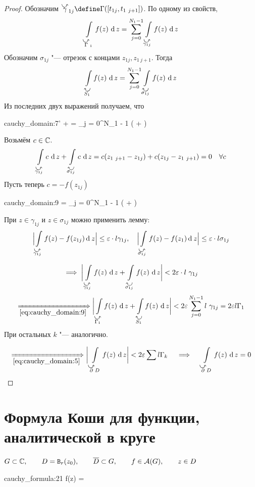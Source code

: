 \begin{proof}
	Обозначим $ \curvedir\gamma_{1j} \define \Gamma([t_{1j}, t_{1~j + 1}]) $. По одному из свойств,
	$$ \cint[z]{\curvedir\Gamma_1}{f(z)} = \sum_{j = 0}^{N_1 - 1} \cint[z]{\curvedir{\gamma_{1j}}}{f(z)} $$
	Обозначим $ \sigma_{1j} $ "--- отрезок с концами $ z_{1j}, z_{1~j + 1} $. Тогда
	$$ \cint[z]{\curvedir[0] {S_1}}{f(z)} = \sum_{j = 0}^{N_1 - 1} \cint[z]{\curvedir[0]{\sigma_{1j}}}{f(z)} $$
	Из последних двух выражений получаем, что
	\begin{equ}{cauchy_domain:7'}
		 +  = \sum_{j = 0}^{N_1 - 1} \bigg(  +  \bigg)
	\end{equ}
	Возьмём $ c \in \mathbb{C} $.
	$$ \cint[z]{\curvedir{\gamma_{1j}}}c + \cint[z]{\curvedir[0]{\sigma_{1j}}}c = c(z_{1~j + 1} - z_{1j}) + c(z_{1j} - z_{1~j + 1}) = 0 \quad \forall c $$
	Пусть теперь $ c = -f(z_{1j}) $
	\begin{equ}{cauchy_domain:9}
		 = \sum_{j = 0}^{N_1 - 1} \bigg(  +  \bigg)
	\end{equ}
	При $ z \in \gamma_{1j} $ и $ z \in \sigma_{1j} $ можно применить лемму:
	$$ \Bigl| \int\limits_{\curvedir{\gamma_{1j}}} f(z) - f(z_{1j}) \di z \Bigr| \le \eps \cdot l \gamma_{1j}, \quad \Bigl| \int\limits_{\curvedir{\sigma_{1j}}} f(z) - f(z_1) \di z \Bigr| \le \eps \cdot l \sigma_{1j} $$

	$$ \implies \bigg| \cint[z]{\curvedir{\gamma_{1j}}}{f(z)} + \cint[z]{\curvedir[0]{\sigma_{1j}}}{f(z)} \bigg| < 2\eps \cdot l ~ \gamma_{1j} $$
	$$ \underimp{\eref{cauchy_domain:9}} \bigg| \cint[z]{\curvedir{\Gamma_1}}{f(z)} + \cint[z]{\curvedir[0]{S_1}}{f(z)} \bigg| < 2\eps \sum_{j = 0}^{N_1 - 1} l ~ \gamma_{1j} = 2 \eps l \Gamma_1 $$
	При остальных $ k $ "--- аналогично.

	$$ \underimp{\eref{cauchy_domain:5}} \bigg| \cint[z]{\curvedir\partial D}{f(z)} \bigg| < 2\eps \sum l \Gamma_k \quad
	\implies \quad \cint[z]{\curvedir\partial D}{f(z)} = 0 $$
\end{proof}

\section{Формула Коши для функции, аналитической в круге}

\begin{theorem}
	$ G \subset \mathbb{C}, \qquad D = \mathtt B_r(z_0), \qquad \overline D \subset G, \qquad f \in \mathcal A(G), \qquad z \in D $
	\begin{equ}{cauchy_formula:21}
		f(z) =  
	\end{equ}
\end{theorem}

